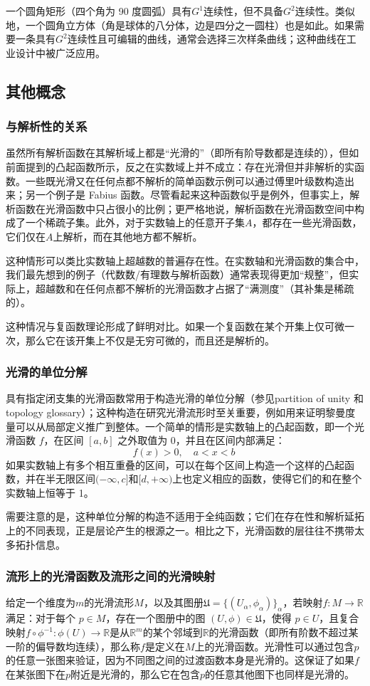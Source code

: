 一个圆角矩形（四个角为 90 度圆弧）具有$G^1$连续性，但不具备$G^2$连续性。类似地，一个圆角立方体（角是球体的八分体，边是四分之一圆柱）也是如此。如果需要一条具有$G^2$连续性且可编辑的曲线，通常会选择三次样条曲线；这种曲线在工业设计中被广泛应用。
\subsection{其他概念}
\subsubsection{与解析性的关系}
虽然所有解析函数在其解析域上都是“光滑的”（即所有阶导数都是连续的），但如前面提到的凸起函数所示，反之在实数域上并不成立：存在光滑但并非解析的实函数。一些既光滑又在任何点都不解析的简单函数示例可以通过傅里叶级数构造出来；另一个例子是 Fabius 函数。尽管看起来这种函数似乎是例外，但事实上，解析函数在光滑函数中只占很小的比例；更严格地说，解析函数在光滑函数空间中构成了一个稀疏子集。此外，对于实数轴上的任意开子集$A$，都存在一些光滑函数，它们仅在$A$上解析，而在其他地方都不解析。

这种情形可以类比实数轴上超越数的普遍存在性。在实数轴和光滑函数的集合中，我们最先想到的例子（代数数/有理数与解析函数）通常表现得更加“规整”，但实际上，超越数和在任何点都不解析的光滑函数才占据了“满测度”（其补集是稀疏的）。

这种情况与复函数理论形成了鲜明对比。如果一个复函数在某个开集上仅可微一次，那么它在该开集上不仅是无穷可微的，而且还是解析的。
\subsubsection{光滑的单位分解}
具有指定闭支集的光滑函数常用于构造光滑的单位分解（参见partition of unity 和topology glossary）；这种构造在研究光滑流形时至关重要，例如用来证明黎曼度量可以从局部定义推广到整体。一个简单的情形是实数轴上的凸起函数，即一个光滑函数 $f$，在区间 $[a,b]$ 之外取值为 0，并且在区间内部满足：
$$
f(x) > 0, \quad a < x < b~
$$
如果实数轴上有多个相互重叠的区间，可以在每个区间上构造一个这样的凸起函数，并在半无限区间$(-\infty, c]$和$[d, +\infty)$上也定义相应的函数，使得它们的和在整个实数轴上恒等于 1。

需要注意的是，这种单位分解的构造不适用于全纯函数；它们在存在性和解析延拓上的不同表现，正是层论产生的根源之一。相比之下，光滑函数的层往往不携带太多拓扑信息。
\subsubsection{流形上的光滑函数及流形之间的光滑映射}
给定一个维度为$m$的光滑流形$M$，以及其图册$\mathfrak{U} = \{(U_\alpha, \phi_\alpha)\}_\alpha$，若映射$f: M \to \mathbb{R}$满足：对于每个 $p \in M$，存在一个图册中的图 $(U, \phi) \in \mathfrak{U}$，使得 $p \in U$，且复合映射$f \circ \phi^{-1} : \phi(U) \to \mathbb{R}$是从$\mathbb{R}^m$的某个邻域到$\mathbb{R}$的光滑函数（即所有阶数不超过某一阶的偏导数均连续），那么称$f$是定义在$M$上的光滑函数。光滑性可以通过包含$p$的任意一张图来验证，因为不同图之间的过渡函数本身是光滑的。这保证了如果$f$在某张图下在$p$附近是光滑的，那么它在包含$p$的任意其他图下也同样是光滑的。

